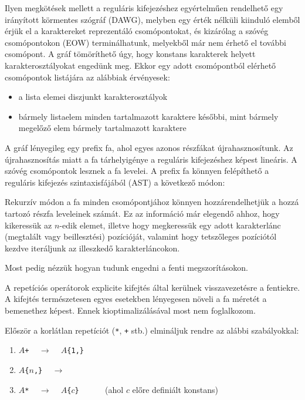 \documentclass[
    parspace,
    noindent,
    nohyp,
]{elteiktdk}[2023/04/10]
\begin{document}
Ilyen megkötések mellett a reguláris kifejezéshez egyértelműen rendelhető egy
irányított körmentes szógráf (DAWG),
melyben egy érték nélküli kiinduló elemből érjük el a karaktereket reprezentáló csomópontokat,
és kizárólag a szóvég csomópontokon (EOW) terminálhatunk,
melyekből már nem érhető el további csomópont.
A gráf tömöríthető úgy, hogy konstans karakterek helyett karakterosztályokat engedünk meg.
Ekkor egy adott csomópontból elérhető csomópontok listájára az alábbiak érvényesek:

\begin{itemize}
    \item a lista elemei diszjunkt karakterosztályok
    \item bármely listaelem minden tartalmazott karaktere későbbi, mint bármely megelőző elem bármely tartalmazott karaktere
\end{itemize}


A gráf lényegileg egy prefix fa, ahol egyes azonos részfákat újrahasznosítunk.
Az újrahasznosítás miatt a fa tárhelyigénye a reguláris kifejezéshez képest lineáris.
A szóvég csomópontok lesznek a fa levelei.
A prefix fa könnyen felépíthető a reguláris kifejezés szintaxisfájából (AST)
a következő módon:


Rekurzív módon a fa minden csomópontjához könnyen hozzárendelhetjük
a hozzá tartozó részfa leveleinek számát.
Ez az információ már elegendő ahhoz, hogy kikeressük az $n$-edik elemet,
illetve hogy megkeressük egy adott karakterlánc (megtalált vagy beillesztési) pozícióját,
valamint hogy tetszőleges pozíciótól kezdve iteráljunk az illeszkedő karakterláncokon.


Most pedig nézzük hogyan tudunk engedni a fenti megszorításokon.

A repetíciós operátorok explicite kifejtés által kerülnek visszavezetésre a fentiekre.
A kifejtés természetesen egyes esetekben lényegesen növeli a fa méretét a bemenethez képest.
Ennek kioptimalizálásával most nem foglalkozom.

Először a korlátlan repetíciót (\texttt{*}, \texttt{+} stb.) elmináljuk rendre az alábbi szabályokkal:

\begin{enumerate}
    \item \texttt{$A$+} ~ $\longrightarrow$ ~ \texttt{$A$\{1,\}}
    \item \texttt{$A$\{$n$,\}} ~ $\longrightarrow$ ~ 
    \item \texttt{$A$*} ~ $\longrightarrow$ ~ \texttt{$A$\{$c$\}} ~~~~~ (ahol $c$ előre definiált konstans)
\end{enumerate}
\end{document}
